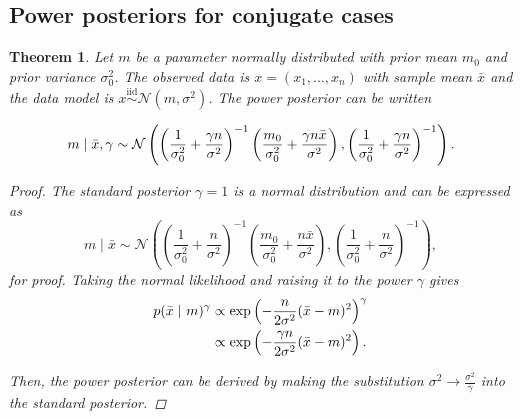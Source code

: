 \documentclass[12pt]{article}
\newtheorem{theorem}{Theorem}
\begin{document}
\subsection{Power posteriors for conjugate cases}\label{appen}
	\begin{theorem}
		\label{proof:pow_norm}
		Let  $m$  be a parameter normally distributed with prior mean $m_0$ and prior variance $\sigma^2_0$. The observed data is $x = (x_1, ..., x_n)$ with sample mean $\bar{x}$ and the data model is $x\overset{\mathrm{iid}}{\sim} \mathcal{N}(m,\sigma^2)$.
		The power posterior can be written
		
		\begin{equation}
			m \;|\; \bar{x}, \gamma \sim \mathcal{N} \left( \left( \frac{1}{\sigma_0^2} + \frac{\gamma n}{\sigma^2} \right)^{-1} \left(\frac{m_0}{\sigma_0^2} + \frac{\gamma n \bar{x}}{\sigma^2}  \right), \left( \frac{1}{\sigma_0^2} + \frac{\gamma n}{\sigma^2} \right)^{-1} \right).\notag
		\end{equation}
		
		\begin{proof}
			The standard posterior $\gamma=1$ is a normal distribution and can be expressed as 
			\begin{equation*}
				m \;|\; \bar{x} \sim \mathcal{N} \left( \left( \frac{1}{\sigma_0^2} + \frac{n}{\sigma^2} \right)^{-1} \left(\frac{m_0}{\sigma_0^2} + \frac{n \bar{x}}{\sigma^2}  \right), \left( \frac{1}{\sigma_0^2} + \frac{n}{\sigma^2} \right)^{-1} \right),
			\end{equation*}
			\cite[see e.g.][]{gelman_bayesian_2020} for proof.
			Taking the normal likelihood and raising it to the power $\gamma$ gives 
			\begin{align}
				p(\bar{x} \;|\ m)^\gamma &\propto \exp\left(-\frac{n}{2\sigma^2}{(\bar{x} - m)^2}\right)^\gamma \notag\\
				& \propto \exp\left(-\frac{\gamma n}{2\sigma^2}{(\bar{x} - m)^2}\right). \notag
			\end{align}
			
			Then, the power posterior can be derived by making the substitution $ \sigma^2 \to \frac{\sigma^2}{\gamma}$ into the standard posterior.
		\end{proof}
	\end{theorem}
	
\end{document}
